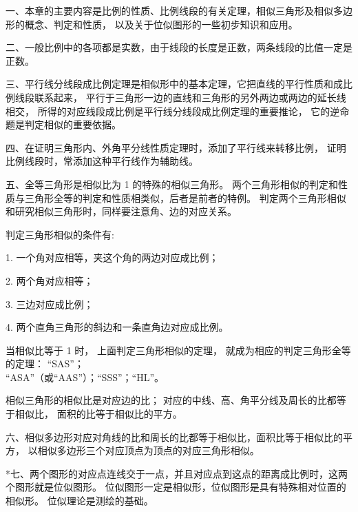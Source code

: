 \xiaojie

一、本章的主要内容是比例的性质、比例线段的有关定理，相似三角形及相似多边形的概念、判定和性质，
以及关于位似图形的一些初步知识和应用。


二、一般比例中的各项都是实数，由于线段的长度是正数，两条线段的比值一定是正数。


三、平行线分线段成比例定理是相似形中的基本定理，它把直线的平行性质和成比例线段联系起来，
平行于三角形一边的直线和三角形的另外两边或两边的延长线相交，
所得的对应线段成比例是平行线分线段成比例定理的重要推论，
它的逆命题是判定相似的重要依据。


四、在证明三角形内、外角平分线性质定理时，添加了平行线来转移比例，
证明比例线段时，常添加这种平行线作为辅助线。


五、全等三角形是相似比为 1 的特殊的相似三角形。
两个三角形相似的判定和性质与三角形全等的判定和性质相类似，后者是前者的特例。
判定两个三角形相似和研究相似三角形时，同样要注意角、边的对应关系。

判定三角形相似的条件有:

1. 一个角对应相等，夹这个角的两边对应成比例；

2. 两个角对应相等；

3. 三边对应成比例；

4. 两个直角三角形的斜边和一条直角边对应成比例。

当相似比等于 1 时， 上面判定三角形相似的定理， 就成为相应的判定三角形全等的定理： “SAS”； \\
“ASA”（或“AAS”）；“SSS”；“HL”。

相似三角形的相似比是对应边的比；
对应的中线、高、角平分线及周长的比都等于相似比，
面积的比等于相似比的平方。


六、相似多边形对应对角线的比和周长的比都等于相似比，面积比等于相似比的平方，
以相似多边形三个对应顶点为顶点的对应三角形相似。


*七、两个图形的对应点连线交于一点，并且对应点到这点的距离成比例时，这两个图形就是位似图形。
位似图形一定是相似形，位似图形是具有特殊相对位置的相似形。
位似理论是测绘的基础。

